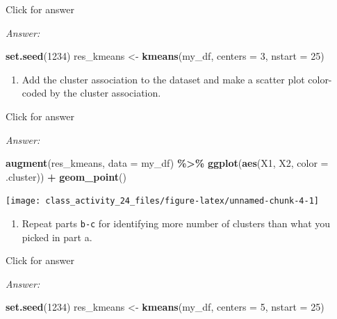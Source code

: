 \documentclass[
]{book}
\newenvironment{Shaded}{\begin{snugshade}}{\end{snugshade}}
\newcommand{\AttributeTok}[1]{\textcolor[rgb]{0.13,0.29,0.53}{#1}}
\newcommand{\DecValTok}[1]{\textcolor[rgb]{0.00,0.00,0.81}{#1}}
\newcommand{\FunctionTok}[1]{\textcolor[rgb]{0.13,0.29,0.53}{\textbf{#1}}}
\newcommand{\NormalTok}[1]{#1}
\newcommand{\OtherTok}[1]{\textcolor[rgb]{0.56,0.35,0.01}{#1}}
\newcommand{\SpecialCharTok}[1]{\textcolor[rgb]{0.81,0.36,0.00}{\textbf{#1}}}
\providecommand{\tightlist}{%
  \setlength{\itemsep}{0pt}\setlength{\parskip}{0pt}}
\begin{document}
Click for answer

\emph{Answer:}

\begin{Shaded}
\begin{Highlighting}[]
\FunctionTok{set.seed}\NormalTok{(}\DecValTok{1234}\NormalTok{)}
\NormalTok{res\_kmeans }\OtherTok{\textless{}{-}} \FunctionTok{kmeans}\NormalTok{(my\_df, }\AttributeTok{centers =} \DecValTok{3}\NormalTok{, }\AttributeTok{nstart =} \DecValTok{25}\NormalTok{)}
\end{Highlighting}
\end{Shaded}

\begin{enumerate}
\def\labelenumi{\alph{enumi}.}
\setcounter{enumi}{2}
\tightlist
\item
  Add the cluster association to the dataset and make a scatter plot color-coded by the cluster association.
\end{enumerate}

Click for answer

\emph{Answer:}

\begin{Shaded}
\begin{Highlighting}[]
\FunctionTok{augment}\NormalTok{(res\_kmeans, }\AttributeTok{data =}\NormalTok{ my\_df) }\SpecialCharTok{\%\textgreater{}\%}
  \FunctionTok{ggplot}\NormalTok{(}\FunctionTok{aes}\NormalTok{(X1, X2, }\AttributeTok{color =}\NormalTok{ .cluster)) }\SpecialCharTok{+}
  \FunctionTok{geom\_point}\NormalTok{()}
\end{Highlighting}
\end{Shaded}

\texttt{[image: class\_activity\_24\_files/figure-latex/unnamed-chunk-4-1]}

\begin{enumerate}
\def\labelenumi{\alph{enumi}.}
\setcounter{enumi}{3}
\tightlist
\item
  Repeat parts \texttt{b-c} for identifying more number of clusters than what you picked in part a.
\end{enumerate}

Click for answer

\emph{Answer:}

\begin{Shaded}
\begin{Highlighting}[]
\FunctionTok{set.seed}\NormalTok{(}\DecValTok{1234}\NormalTok{)}
\NormalTok{res\_kmeans }\OtherTok{\textless{}{-}} \FunctionTok{kmeans}\NormalTok{(my\_df, }\AttributeTok{centers =} \DecValTok{5}\NormalTok{, }\AttributeTok{nstart =} \DecValTok{25}\NormalTok{)}
\end{Highlighting}
\end{Shaded}
\end{document}
